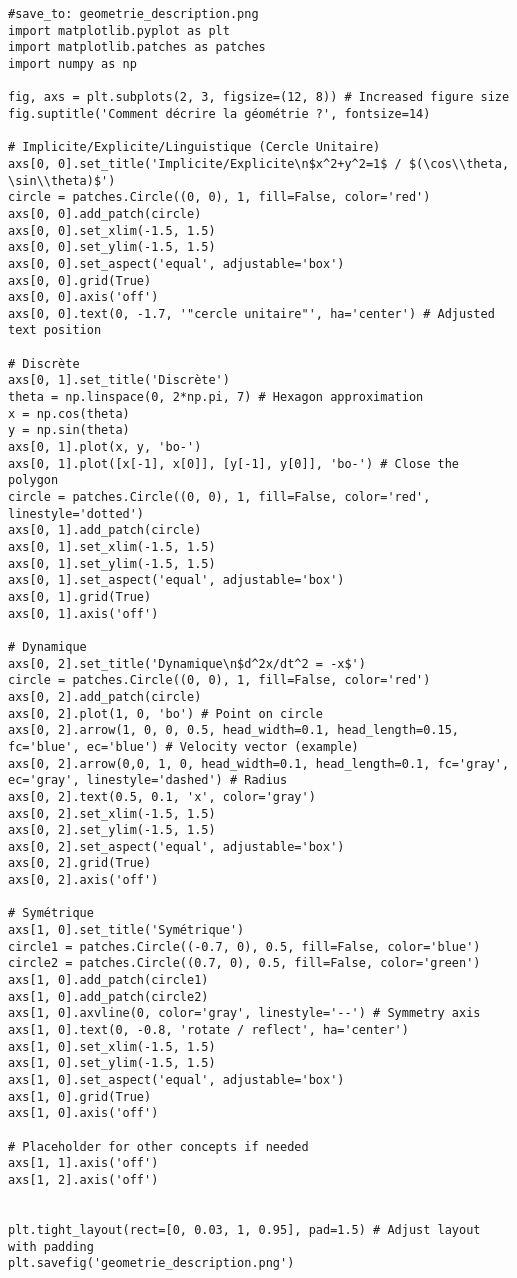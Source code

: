 \documentclass{article}
\begin{document}
\begin{verbatim}
#save_to: geometrie_description.png
import matplotlib.pyplot as plt
import matplotlib.patches as patches
import numpy as np

fig, axs = plt.subplots(2, 3, figsize=(12, 8)) # Increased figure size
fig.suptitle('Comment décrire la géométrie ?', fontsize=14)

# Implicite/Explicite/Linguistique (Cercle Unitaire)
axs[0, 0].set_title('Implicite/Explicite\n$x^2+y^2=1$ / $(\cos\\theta, \sin\\theta)$')
circle = patches.Circle((0, 0), 1, fill=False, color='red')
axs[0, 0].add_patch(circle)
axs[0, 0].set_xlim(-1.5, 1.5)
axs[0, 0].set_ylim(-1.5, 1.5)
axs[0, 0].set_aspect('equal', adjustable='box')
axs[0, 0].grid(True)
axs[0, 0].axis('off')
axs[0, 0].text(0, -1.7, '"cercle unitaire"', ha='center') # Adjusted text position

# Discrète
axs[0, 1].set_title('Discrète')
theta = np.linspace(0, 2*np.pi, 7) # Hexagon approximation
x = np.cos(theta)
y = np.sin(theta)
axs[0, 1].plot(x, y, 'bo-')
axs[0, 1].plot([x[-1], x[0]], [y[-1], y[0]], 'bo-') # Close the polygon
circle = patches.Circle((0, 0), 1, fill=False, color='red', linestyle='dotted')
axs[0, 1].add_patch(circle)
axs[0, 1].set_xlim(-1.5, 1.5)
axs[0, 1].set_ylim(-1.5, 1.5)
axs[0, 1].set_aspect('equal', adjustable='box')
axs[0, 1].grid(True)
axs[0, 1].axis('off')

# Dynamique
axs[0, 2].set_title('Dynamique\n$d^2x/dt^2 = -x$')
circle = patches.Circle((0, 0), 1, fill=False, color='red')
axs[0, 2].add_patch(circle)
axs[0, 2].plot(1, 0, 'bo') # Point on circle
axs[0, 2].arrow(1, 0, 0, 0.5, head_width=0.1, head_length=0.15, fc='blue', ec='blue') # Velocity vector (example)
axs[0, 2].arrow(0,0, 1, 0, head_width=0.1, head_length=0.1, fc='gray', ec='gray', linestyle='dashed') # Radius
axs[0, 2].text(0.5, 0.1, 'x', color='gray')
axs[0, 2].set_xlim(-1.5, 1.5)
axs[0, 2].set_ylim(-1.5, 1.5)
axs[0, 2].set_aspect('equal', adjustable='box')
axs[0, 2].grid(True)
axs[0, 2].axis('off')

# Symétrique
axs[1, 0].set_title('Symétrique')
circle1 = patches.Circle((-0.7, 0), 0.5, fill=False, color='blue')
circle2 = patches.Circle((0.7, 0), 0.5, fill=False, color='green')
axs[1, 0].add_patch(circle1)
axs[1, 0].add_patch(circle2)
axs[1, 0].axvline(0, color='gray', linestyle='--') # Symmetry axis
axs[1, 0].text(0, -0.8, 'rotate / reflect', ha='center')
axs[1, 0].set_xlim(-1.5, 1.5)
axs[1, 0].set_ylim(-1.5, 1.5)
axs[1, 0].set_aspect('equal', adjustable='box')
axs[1, 0].grid(True)
axs[1, 0].axis('off')

# Placeholder for other concepts if needed
axs[1, 1].axis('off')
axs[1, 2].axis('off')


plt.tight_layout(rect=[0, 0.03, 1, 0.95], pad=1.5) # Adjust layout with padding
plt.savefig('geometrie_description.png')
\end{verbatim}
\end{document}
